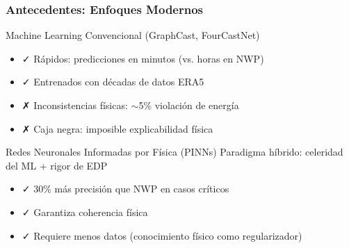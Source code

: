 \begin{frame}[fragile]
  \frametitle{Antecedentes: Enfoques Modernos}
  
  \begin{block}{Machine Learning Convencional (GraphCast, FourCastNet)}
    \begin{itemize}
      \item \textcolor{ColorVerdeOliva}{✓ Rápidos: predicciones en minutos (vs. horas en NWP)}
      \item \textcolor{ColorVerdeOliva}{✓ Entrenados con décadas de datos ERA5}
      \item \textcolor{ColorRojoVino}{✗ Inconsistencias físicas: $\sim$5\% violación de energía}
      \item \textcolor{ColorRojoVino}{✗ Caja negra: imposible explicabilidad física}
    \end{itemize}
  \end{block}
  
  \begin{block}{Redes Neuronales Informadas por Física (PINNs)}
    Paradigma híbrido: celeridad del ML + rigor de EDP
    \begin{itemize}
      \item ✓ 30\% más precisión que NWP en casos críticos
      \item ✓ Garantiza coherencia física
      \item ✓ Requiere menos datos (conocimiento físico como regularizador)
    \end{itemize}
  \end{block}
  
\end{frame}
